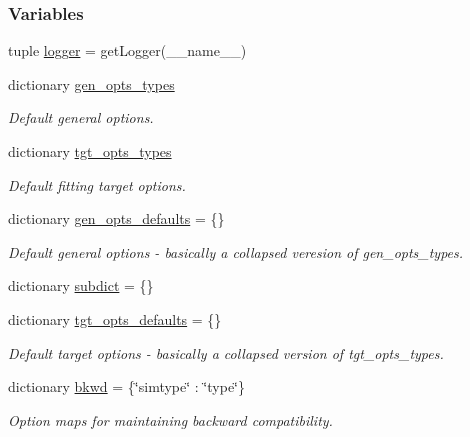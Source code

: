 \subsubsection*{Variables}
\begin{DoxyCompactItemize}
\item 
tuple \hyperlink{namespaceforcebalance_1_1parser_ab1a411e01f194a0a8fc51b5aaf4b05ac}{logger} = get\-Logger(\-\_\-\-\_\-name\-\_\-\-\_\-)
\item 
dictionary \hyperlink{namespaceforcebalance_1_1parser_a1ccdff008f4be5f63c068d2a592d69ab}{gen\-\_\-opts\-\_\-types}
\begin{DoxyCompactList}\small\item\em Default general options. \end{DoxyCompactList}\item 
dictionary \hyperlink{namespaceforcebalance_1_1parser_a95436b7fb9e99bd7b9f0a040b15fbe3a}{tgt\-\_\-opts\-\_\-types}
\begin{DoxyCompactList}\small\item\em Default fitting target options. \end{DoxyCompactList}\item 
dictionary \hyperlink{namespaceforcebalance_1_1parser_a980fd024b1f2877247de482247250b9e}{gen\-\_\-opts\-\_\-defaults} = \{\}
\begin{DoxyCompactList}\small\item\em Default general options -\/ basically a collapsed veresion of gen\-\_\-opts\-\_\-types. \end{DoxyCompactList}\item 
dictionary \hyperlink{namespaceforcebalance_1_1parser_abb7a7e9723de629aa97727a85bcdbad1}{subdict} = \{\}
\item 
dictionary \hyperlink{namespaceforcebalance_1_1parser_aff4922444f06b7334a0994a835607393}{tgt\-\_\-opts\-\_\-defaults} = \{\}
\begin{DoxyCompactList}\small\item\em Default target options -\/ basically a collapsed version of tgt\-\_\-opts\-\_\-types. \end{DoxyCompactList}\item 
dictionary \hyperlink{namespaceforcebalance_1_1parser_a121eaaef101563523a8fb20bd5ace409}{bkwd} = \{\char`\"{}simtype\char`\"{} \-: \char`\"{}type\char`\"{}\}
\begin{DoxyCompactList}\small\item\em Option maps for maintaining backward compatibility. \end{DoxyCompactList}\item 

\end{DoxyCompactItemize}

